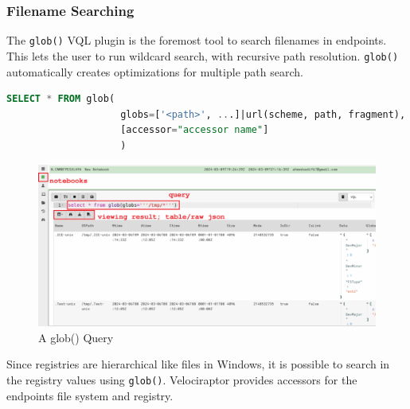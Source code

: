 \documentclass[a4paper, 11pt, oneside]{article} %
\begin{document}
\subsubsection{Filename Searching}\label{glob}
The \verb|glob()| VQL plugin is the foremost tool to search filenames in endpoints. This lets the user to run wildcard search, with recursive path resolution. \verb|glob()| automatically creates optimizations for multiple path search.
\begin{lstlisting}[basicstyle=\ttfamily, breaklines=true, language=SQL]
        SELECT * FROM glob(
                    globs=['<path>', ...]|url(scheme, path, fragment),
                    [accessor="accessor name"]
                    )
\end{lstlisting}
\begin{figure}[ht]
    \centering
    \includegraphics[width=\linewidth, scale=0.35, center]{img/forensic/glob1.png}
    \caption{A glob() Query}
    \label{fig:glob1}
\end{figure}
Since registries are hierarchical like files in Windows, it is possible to search in the registry values using \verb|glob()|. Velociraptor provides accessors for the endpoints file system and registry.
\end{document}
